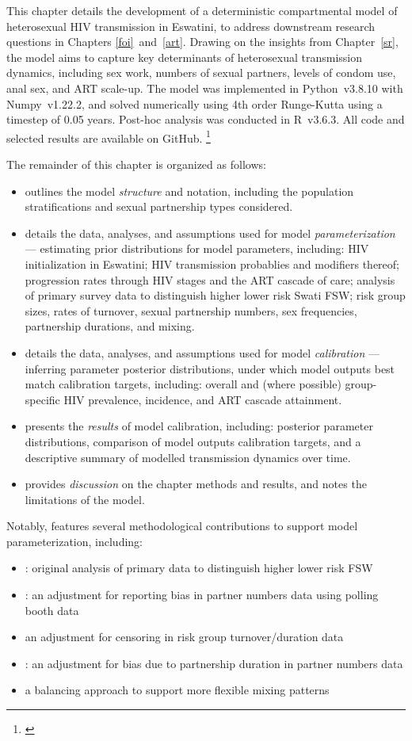 This chapter details the development of
a deterministic compartmental model of heterosexual HIV transmission in Eswatini,
to address downstream research questions in Chapters \ref{foi}~and~\ref{art}.
Drawing on the insights from Chapter~\ref{sr},
the model aims to capture key determinants of heterosexual transmission dynamics, including
sex work, numbers of sexual partners, levels of condom use, anal sex, and ART scale-up.
The model was implemented in Python~v3.8.10 with Numpy~v1.22.2,
and solved numerically using 4th order Runge-Kutta \cite{Gill1951} using a timestep of 0.05 years.
Post-hoc analysis was conducted in R~v3.6.3.
All code and selected results are available on GitHub.%
\footnote{\label{foot:github}}
\par
The remainder of this chapter is organized as follows:
\newcommand{\iref}[1]{\item \sref{#1}}
\begin{itemize}
  \iref{model.str} outlines the model \emph{structure} and notation, including
  the population stratifications and sexual partnership types considered.
  \iref{model.par} details the data, analyses, and assumptions used for model \emph{parameterization}
  --- \ie estimating prior distributions for model parameters, including:
  HIV initialization in Eswatini;
  HIV transmission probablies and modifiers thereof;
  progression rates through HIV stages and the ART cascade of care;
  analysis of primary survey data to distinguish higher \vs lower risk Swati FSW;
  risk group sizes, rates of turnover, sexual partnership numbers,
  sex frequencies, partnership durations, and mixing.
  \iref{model.cal} details the data, analyses, and assumptions used for model \emph{calibration}
  --- \ie inferring parameter posterior distributions,
  under which model outputs best match calibration targets, including:
  overall and (where possible) group-specific HIV prevalence, incidence, and ART cascade attainment.
  \iref{model.res} presents the \emph{results} of model calibration, including:
  posterior parameter distributions, comparison of model outputs \vs calibration targets, and
  a descriptive summary of modelled transmission dynamics over time.
  \iref{model.disc} provides \emph{discussion} on the chapter methods and results,
  and notes the limitations of the model.
\end{itemize}
\clearpage %
Notably,  features several methodological contributions
to support model parameterization, including:
\begin{itemize}
  \item{}:
  original analysis of primary data to distinguish higher \vs lower risk FSW
  \item{}:
  an adjustment for reporting bias in partner numbers data using polling booth data
  \item{}
  an adjustment for censoring in risk group turnover/duration data
  \item{}:
  an adjustment for bias due to partnership duration in partner numbers data
  \item{}
  a balancing approach to support more flexible mixing patterns
\end{itemize}
